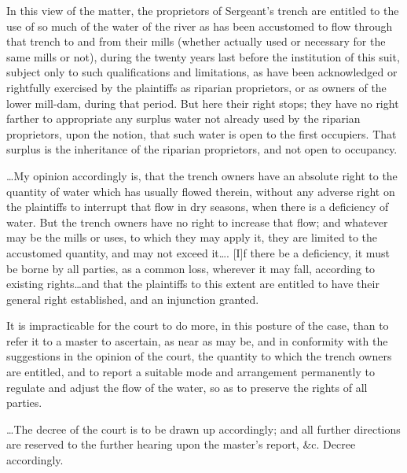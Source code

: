 In this view of the matter, the proprietors of Sergeant's trench are entitled to
the use of so much of the water of the river as has been accustomed to flow
through that trench to and from their mills (whether actually used or necessary
for the same mills or not), during the twenty years last before the institution
of this suit, subject only to such qualifications and limitations, as have been
acknowledged or rightfully exercised by the plaintiffs as riparian proprietors,
or as owners of the lower mill-dam, during that period. But here their right
stops; they have no right farther to appropriate any surplus water not already
used by the riparian proprietors, upon the notion, that such water is open to
the first occupiers. That surplus is the inheritance of the riparian
proprietors, and not open to occupancy.

\ldots My opinion accordingly is, that the trench owners have an absolute right
to the quantity of water which has usually flowed therein, without any adverse
right on the plaintiffs to interrupt that flow in dry seasons, when there is a
deficiency of water. But the trench owners have no right to increase that flow;
and whatever may be the mills or uses, to which they may apply it, they are
limited to the accustomed quantity, and may not exceed it\ldots . [I]f there be
a deficiency, it must be borne by all parties, as a common loss, wherever it may
fall, according to existing rights\ldots and that the plaintiffs to this extent
are entitled to have their general right established, and an injunction granted.

It is impracticable for the court to do more, in this posture of the case, than
to refer it to a master to ascertain, as near as may be, and in conformity with
the suggestions in the opinion of the court, the quantity to which the trench
owners are entitled, and to report a suitable mode and arrangement permanently
to regulate and adjust the flow of the water, so as to preserve the rights of
all parties.

\ldots The decree of the court is to be drawn up accordingly; and all further
directions are reserved to the further hearing upon the master's report, \&c.
Decree accordingly.

